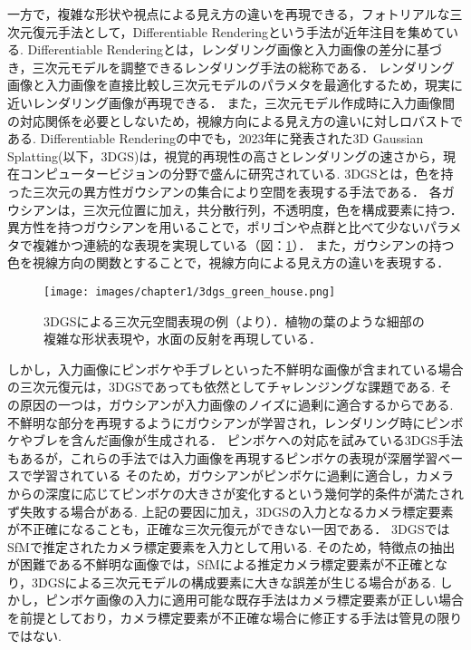 一方で，複雑な形状や視点による見え方の違いを再現できる，フォトリアルな三次元復元手法として，Differentiable Renderingという手法が近年注目を集めている.
Differentiable Renderingとは，レンダリング画像と入力画像の差分に基づき，三次元モデルを調整できるレンダリング手法の総称である\cite{differentiable_rendering}．
レンダリング画像と入力画像を直接比較し三次元モデルのパラメタを最適化するため，現実に近いレンダリング画像が再現できる．
また，三次元モデル作成時に入力画像間の対応関係を必要としないため，視線方向による見え方の違いに対しロバストである.
Differentiable Renderingの中でも，2023年に発表された3D Gaussian Splatting(以下，3DGS)\cite{3dgs}は，視覚的再現性の高さとレンダリングの速さから，現在コンピュータービジョンの分野で盛んに研究されている.
3DGSとは，色を持った三次元の異方性ガウシアンの集合により空間を表現する手法である．
各ガウシアンは，三次元位置に加え，共分散行列，不透明度，色を構成要素に持つ．
異方性を持つガウシアンを用いることで，ポリゴンや点群と比べて少ないパラメタで複雑かつ連続的な表現を実現している（図：\ref{fig:green-house}）．
また，ガウシアンの持つ色を視線方向の関数とすることで，視線方向による見え方の違いを表現する．\par

\begin{figure}[h]
    \centering
    \texttt{[image: images/chapter1/3dgs\_green\_house.png]}
    \caption[3DGSによる三次元空間表現の例]{3DGSによる三次元空間表現の例（\cite{green-house}より）．植物の葉のような細部の複雑な形状表現や，水面の反射を再現している．}
    \label{fig:green-house}
\end{figure}

しかし，入力画像にピンボケや手ブレといった不鮮明な画像が含まれている場合の三次元復元は，3DGSであっても依然としてチャレンジングな課題である.
その原因の一つは，ガウシアンが入力画像のノイズに過剰に適合するからである.
不鮮明な部分を再現するようにガウシアンが学習され，レンダリング時にピンボケやブレを含んだ画像が生成される．
ピンボケへの対応を試みている3DGS手法\cite{Deblurring3dgs}\cite{BAGS}もあるが，これらの手法では入力画像を再現するピンボケの表現が深層学習ベースで学習されている
そのため，ガウシアンがピンボケに過剰に適合し，カメラからの深度に応じてピンボケの大きさが変化するという幾何学的条件が満たされず失敗する場合がある.
上記の要因に加え，3DGSの入力となるカメラ標定要素が不正確になることも，正確な三次元復元ができない一因である．
3DGSではSfMで推定されたカメラ標定要素を入力として用いる.
そのため，特徴点の抽出が困難である不鮮明な画像では，SfMによる推定カメラ標定要素が不正確となり，3DGSによる三次元モデルの構成要素に大きな誤差が生じる場合がある.
しかし，ピンボケ画像の入力に適用可能な既存手法はカメラ標定要素が正しい場合を前提としており，カメラ標定要素が不正確な場合に修正する手法は管見の限りではない.\par

